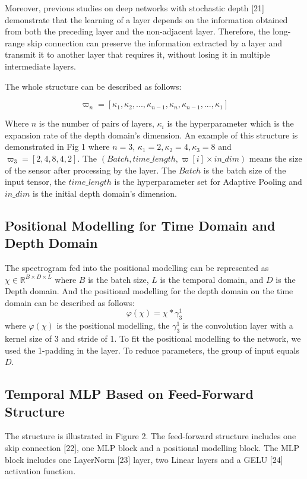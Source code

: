 \documentclass[runningheads]{llncs}
\begin{document}
Moreover, previous studies on deep networks with stochastic depth [21] demonstrate that the learning of a layer depends on the information obtained from both the preceding layer and the non-adjacent layer. Therefore, the long-range skip connection can preserve the information extracted by a layer and transmit it to another layer that requires it, without losing it in multiple intermediate layers.

The whole structure can be described as follows:

\begin{equation}\label{eq}
    \varpi_n=[\kappa_1,\kappa_2,...,\kappa_{n-1} ,\kappa_n,\kappa_{n-1},...,\kappa _1 ]
\end{equation}

Where $n$ is the number of pairs of layers, $\kappa_i$  is the hyperparameter which is the expansion rate  of the depth domain's dimension. An example of this structure is demonstrated in Fig 1 where $n=3$, $\kappa_1=2,\kappa_2=4,\kappa_3=8$ and $\varpi_3=[2,4,8,4,2]$. The $(Batch,time\_length,\varpi[i] \times in\_dim)$ means the size of the sensor after processing by the layer. The $Batch$ is the batch size of the input tensor, the $time\_length$ is the hyperparameter set for Adaptive Pooling and $in\_dim$ is the initial depth domain's dimension. 

\subsection{Positional Modelling for Time Domain and Depth Domain}
The spectrogram fed into the positional modelling can be represented as $\chi \in \mathbb{R}^{ B\times D \times L}$ where $B$ is the batch size, $L$ is the temporal domain, and $D$ is the Depth domain. And the positional modelling for the depth domain on the time domain can be described as follows:
\begin{equation}\label{eq1}
\varphi(\chi) = \chi * \gamma_{3}^{1}
\end{equation}
where $\varphi(\chi)$ is the positional modelling, the $\gamma_{3}^{1}$ is the convolution layer with a kernel size of 3 and stride of 1. To fit the positional modelling to the network, we used the 1-padding in the layer. To reduce parameters, the group of input equals $D$.

\subsection{ Temporal MLP Based on Feed-Forward Structure}
The structure is illustrated in Figure 2. The feed-forward structure includes one skip connection [22], one MLP block and a positional modelling block. The MLP block includes one LayerNorm [23] layer, two Linear layers and a GELU [24] activation function. 
\end{document}
